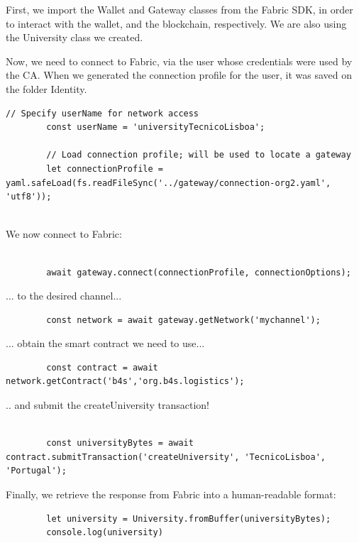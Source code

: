 \documentclass[12pt,a4paper]{article}
\theoremstyle{definition}
\begin{document}
First, we import the Wallet and Gateway classes from the Fabric SDK, in order to interact with the wallet, and the blockchain, respectively. We are also using the University class we created. 

Now, we need to connect to Fabric, via the user whose credentials were used by the CA. When we generated the connection profile for the user, it was saved on the folder Identity.

\begin{verbatim}
// Specify userName for network access
        const userName = 'universityTecnicoLisboa';

        // Load connection profile; will be used to locate a gateway
        let connectionProfile = yaml.safeLoad(fs.readFileSync('../gateway/connection-org2.yaml', 'utf8'));


\end{verbatim}

We now connect to Fabric:
\begin{verbatim}

        await gateway.connect(connectionProfile, connectionOptions);

\end{verbatim}


... to the desired channel...
\begin{verbatim}
        const network = await gateway.getNetwork('mychannel');
\end{verbatim}


... obtain the smart contract we need to use...
\begin{verbatim}
        const contract = await network.getContract('b4s','org.b4s.logistics');

\end{verbatim}

.. and submit the createUniversity transaction!
\begin{verbatim}

        const universityBytes = await contract.submitTransaction('createUniversity', 'TecnicoLisboa', 'Portugal');

\end{verbatim}



Finally, we retrieve the response from Fabric into a human-readable format:

\begin{verbatim}
        let university = University.fromBuffer(universityBytes);
        console.log(university)


\end{verbatim}
\end{document}
